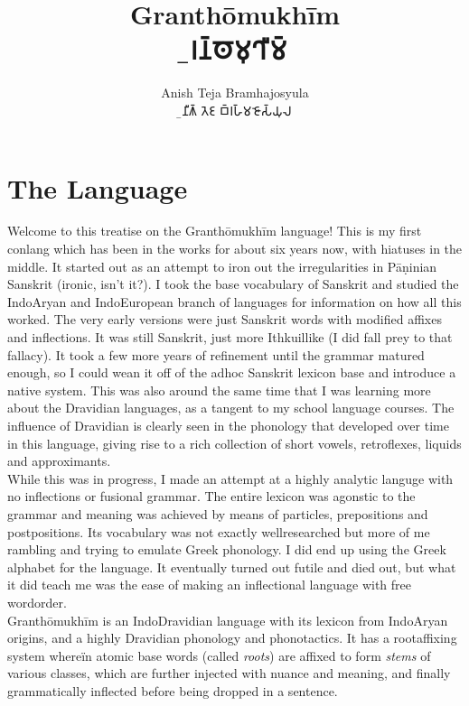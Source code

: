 \documentclass[14pt,oneside]{book}
\title{\Huge Granthōmukhīm \\ \b{𑀕𑁆𑀭𑀦𑁆𑀣𑁄𑀫𑀼𑀔𑀻𑀫𑁆}}
\author{\Large Anish Teja Bramhajosyula \\ \Large \b{𑀅𑀦𑀻𑀰𑁆 𑀢𑁂𑀚 𑀩𑁆𑀭𑀳𑁆𑀫𑀚𑁄𑀲𑁆𑀬𑀼𑀮}}
\date{}
\begin{document}
\maketitle
\tableofcontents


\chapter{The Language}

Welcome to this treatise on the Granthōmukhīm language! This is my first conlang which has been in the works for about six years now, with hiatuses in the middle. It started out as an attempt to iron out the irregularities in Pāṇinian Sanskrit (ironic, isn't it?). I took the base vocabulary of Sanskrit and studied the Indo{\textendash}Aryan and Indo{\textendash}European branch of languages for information on how all this worked. The very early versions were just Sanskrit words with modified affixes and inflections. It was still Sanskrit, just more Ithkuil{\textendash}like (I did fall prey to that fallacy). It took a few more years of refinement until the grammar matured enough, so I could wean it off of the ad{\textendash}hoc Sanskrit lexicon base and introduce a native system. This was also around the same time that I was learning more about the Dravidian languages, as a tangent to my school language courses. The influence of Dravidian is clearly seen in the phonology that developed over time in this language, giving rise to a rich collection of short vowels, retroflexes, liquids and approximants. \\

\noindent While this was in progress, I made an attempt at a highly analytic languge with no inflections or fusional grammar. The entire lexicon was agonstic to the grammar and meaning was achieved by means of particles, prepositions and postpositions. Its vocabulary was not exactly well{\textendash}researched but more of me rambling and trying to emulate Greek phonology. I did end up using the Greek alphabet for the language. It eventually turned out futile and died out, but what it did teach me was the ease of making an inflectional language with free word{\textendash}order. \\

\noindent Granthōmukhīm is an Indo{\textendash}Dravidian language with its lexicon from Indo{\textendash}Aryan origins, and a highly Dravidian phonology and phonotactics. It has a root{\textendash}affixing system whereïn atomic base words (called \textit{roots}) are affixed to form \textit{stems} of various classes, which are further injected with nuance and meaning, and finally grammatically inflected before being dropped in a sentence. \\
\end{document}
